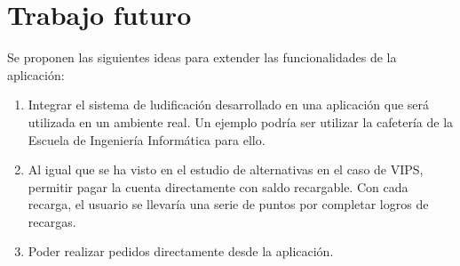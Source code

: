 \documentclass[twoside]{report}
\begin{document}
\section{Trabajo futuro}

Se proponen las siguientes ideas para extender las funcionalidades de la aplicación:

\begin{enumerate}
\item Integrar el sistema de ludificación desarrollado en una aplicación que será utilizada en un ambiente real. Un ejemplo podría ser utilizar la cafetería de la Escuela de Ingeniería Informática para ello.

\item Al igual que se ha visto en el estudio de alternativas en el caso de VIPS, permitir pagar la cuenta directamente con saldo recargable. Con cada recarga, el usuario se llevaría una serie de puntos por completar logros de recargas.

\item Poder realizar pedidos directamente desde la aplicación.
\end{enumerate}
\end{document}
